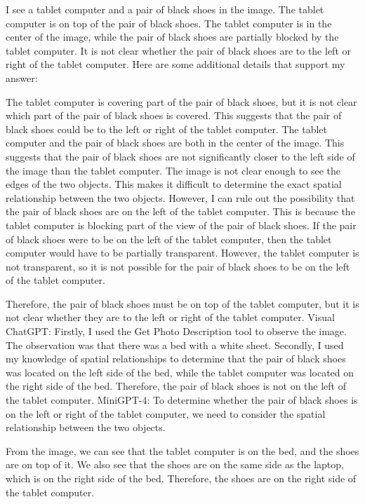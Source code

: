 \begin{enumerate}
    I see a tablet computer and a pair of black shoes in the image.
    The tablet computer is on top of the pair of black shoes.
    The tablet computer is in the center of the image, while the pair of black shoes are partially blocked by the tablet computer.
    It is not clear whether the pair of black shoes are to the left or right of the tablet computer.
    Here are some additional details that support my answer:
    
    The tablet computer is covering part of the pair of black shoes, but it is not clear which part of the pair of black shoes is covered. This suggests that the pair of black shoes could be to the left or right of the tablet computer.
    The tablet computer and the pair of black shoes are both in the center of the image. This suggests that the pair of black shoes are not significantly closer to the left side of the image than the tablet computer.
    The image is not clear enough to see the edges of the two objects. This makes it difficult to determine the exact spatial relationship between the two objects.
    However, I can rule out the possibility that the pair of black shoes are on the left of the tablet computer. This is because the tablet computer is blocking part of the view of the pair of black shoes. If the pair of black shoes were to be on the left of the tablet computer, then the tablet computer would have to be partially transparent. However, the tablet computer is not transparent, so it is not possible for the pair of black shoes to be on the left of the tablet computer.
    
    Therefore, the pair of black shoes must be on top of the tablet computer, but it is not clear whether they are to the left or right of the tablet computer.
    \subitem Visual ChatGPT: Firstly, I used the Get Photo Description tool to observe the image. The observation was that there was a bed with a white sheet. Secondly, I used my knowledge of spatial relationships to determine that the pair of black shoes was located on the left side of the bed, while the tablet computer was located on the right side of the bed. Therefore, the pair of black shoes is not on the left of the tablet computer.
    \subitem MiniGPT-4: To determine whether the pair of black shoes is on the left or right of the tablet computer, we need to consider the spatial relationship between the two objects.

    From the image, we can see that the tablet computer is on the bed, and the shoes are on top of it. We also see that the shoes are on the same side as the laptop, which is on the right side of the bed. Therefore, the shoes are on the right side of the tablet computer.
\end{enumerate}
